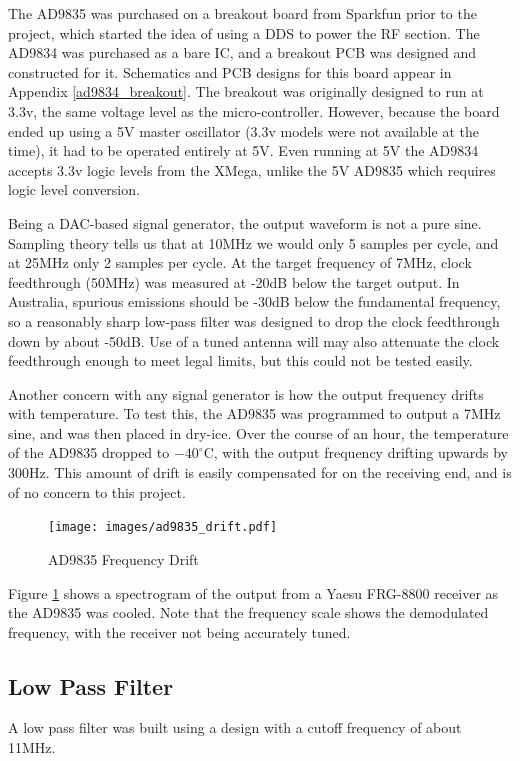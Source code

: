 \documentclass[a4paper,12pt]{article}
\begin{document}
The AD9835 was purchased on a breakout board from Sparkfun prior to the project, which started the idea of using a DDS to power the RF section. The AD9834 was purchased as a bare IC, and a breakout PCB was designed and constructed for it. Schematics and PCB designs for this board appear in Appendix \ref{ad9834_breakout}. The breakout was originally designed to run at 3.3v, the same voltage level as the micro-controller. However, because the board ended up using a 5V master oscillator (3.3v models were not available at the time), it had to be operated entirely at 5V. Even running at 5V the AD9834 accepts 3.3v logic levels from the XMega, unlike the 5V AD9835 which requires logic level conversion.

Being a DAC-based signal generator, the output waveform is not a pure sine. Sampling theory tells us that at 10MHz we would only 5 samples per cycle, and at 25MHz only 2 samples per cycle. At the target frequency of 7MHz, clock feedthrough (50MHz) was measured at -20dB below the target output. In Australia, spurious emissions should be -30dB below the fundamental frequency, so a reasonably sharp low-pass filter was designed to drop the clock feedthrough down by about -50dB. Use of a tuned antenna will may also attenuate the clock feedthrough enough to meet legal limits, but this could not be tested easily.

Another concern with any signal generator is how the output frequency drifts with temperature. To test this, the AD9835 was programmed to output a 7MHz sine, and was then placed in dry-ice. Over the course of an hour, the temperature of the AD9835 dropped to $-40^\circ$C, with the output frequency drifting upwards by 300Hz. This amount of drift is easily compensated for on the receiving end, and is of no concern to this project.

\begin{figure}[h]
  \begin{center}
    \texttt{[image: images/ad9835\_drift.pdf]}
  \end{center}
  \caption{AD9835 Frequency Drift}
  \label{fig:ad9835_drift}
\end{figure}

Figure \ref{fig:ad9835_drift} shows a spectrogram of the output from a Yaesu FRG-8800 receiver as the AD9835 was cooled. Note that the frequency scale shows the demodulated frequency, with the receiver not being accurately tuned. 

\subsection{Low Pass Filter}
A low pass filter was built using a design with a cutoff frequency of about 11MHz. 
\end{document}
